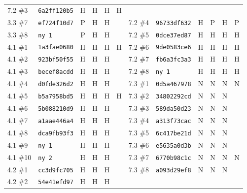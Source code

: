 {\begin{longtable}{@{}llcccc@{\hspace{2em}}llcccc@{}}
     7.2 \#3 & \texttt{6a2ff120b5} & H & H & H & H \\
    3.3 \#7 & \texttt{ef724f10d7} & P & H & H & &
     7.2 \#4 & \texttt{96733df632} & H & P & H & P \\
    3.3 \#8 & \texttt{ny 1} & P & H & H & &
     7.2 \#5 & \texttt{0dce37ed87} & H & H & H & H \\
    4.1 \#1 & \texttt{1a3fae0680} & H & H & H & H &
     7.2 \#6 & \texttt{9de0583ce6} & H & H & H & H \\
    4.1 \#2 & \texttt{923bf50f55} & H & H & H & &
     7.2 \#7 & \texttt{fb6a3fc3a3} & H & H & H & H \\
    4.1 \#3 & \texttt{becef8acdd} & H & H & H & &
     7.2 \#8 & \texttt{ny 1} & H & H & H & H \\
    4.1 \#4 & \texttt{d0fde326d2} & H & H & H & &
     7.3 \#1 & \texttt{0d5a467978} & N & N & N & N \\
    4.1 \#5 & \texttt{b5a7958bd5} & H & H & H & H &
     7.3 \#2 & \texttt{34802292cd} & N & N & N &  \\
    4.1 \#6 & \texttt{5b088210d9} & H & H & H & &
     7.3 \#3 & \texttt{589da50d23} & N & N & N &  \\
    4.1 \#7 & \texttt{a1aae446a4} & H & H & H & &
     7.3 \#4 & \texttt{a313f73cac} & N & N & N &  \\
    4.1 \#8 & \texttt{dca9fb93f3} & H & H & H & &
     7.3 \#5 & \texttt{6c417be21d} & N & N & N &  \\
    4.1 \#9 & \texttt{ny 1} & H & H & H & &
     7.3 \#6 & \texttt{e5635a0d3b} & N & N & N &  \\
    4.1 \#10 & \texttt{ny 2} & H & H & H & &
     7.3 \#7 & \texttt{6770b98c1c} & N & N & N & N \\
    4.2 \#1 & \texttt{cc3d9fc705} & H & H & H & &
     7.3 \#8 & \texttt{a093d29ef8} & N & N & N &  \\
    4.2 \#2 & \texttt{54e41efd97} & H & H & H &  &  & & & & &  \\
\end{longtable}
}

